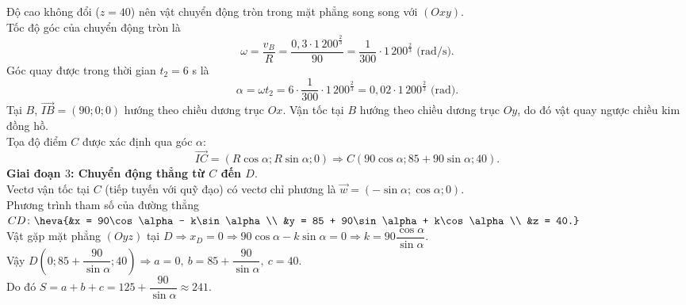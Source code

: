 \begin{ex}
{		Độ cao không đổi ($z = 40$) nên vật chuyển động tròn trong mặt phẳng song song với $(Oxy)$.\\
		Tốc độ góc của chuyển động tròn là
		\[ \omega = \dfrac{v_B}{R} = \dfrac{0{,}3 \cdot 1\,200^{\tfrac{2}{3}}}{90} = \dfrac{1}{300} \cdot 1\,200^{\tfrac{2}{3}} \text{ (rad/s)}. \]
		Góc quay được trong thời gian $t_2 = 6$ s là
		\[ \alpha = \omega t_2 = 6 \cdot \dfrac{1}{300} \cdot 1\,200^{\tfrac{2}{3}} = 0{,}02 \cdot 1\,200^{\tfrac{2}{3}} \text{ (rad)}.\]
		Tại $B$, $\overrightarrow{IB} = (90; 0; 0)$ hướng theo chiều dương trục $Ox$. Vận tốc tại $B$ hướng theo chiều dương trục $Oy$, do đó vật quay ngược chiều kim đồng hồ.\\
		Tọa độ điểm $C$ được xác định qua góc $\alpha$:
		\[ \overrightarrow{IC} = (R\cos\alpha; R\sin\alpha; 0) \Rightarrow C(90\cos\alpha; 85 + 90\sin\alpha; 40). \]		
		\textbf{Giai đoạn $3$: Chuyển động thẳng từ $C$ đến $D$}.\\		
		Vectơ vận tốc tại $C$ (tiếp tuyến với quỹ đạo) có vectơ chỉ phương là $\overrightarrow{w} = (-\sin\alpha; \cos\alpha; 0)$.\\
		Phương trình tham số của đường thẳng $CD\colon \heva{&x = 90\cos\alpha - k\sin\alpha \\ &y = 85 + 90\sin\alpha + k\cos\alpha \\ &z = 40.} $\\
		Vật gặp mặt phẳng $(Oyz)$ tại $D \Rightarrow x_D = 0 \Rightarrow 90\cos\alpha - k\sin\alpha = 0 \Rightarrow k = 90\dfrac{\cos\alpha}{\sin\alpha}$.\\
		Vậy $D\left(0; 85 + \dfrac{90}{\sin\alpha}; 40\right) \Rightarrow a = 0{,}\ b = 85 + \dfrac{90}{\sin\alpha},\ c = 40$.\\
		Do đó $S = a + b + c = 125 + \dfrac{90}{\sin\alpha}\approx 241$.
	}
\end{ex}

